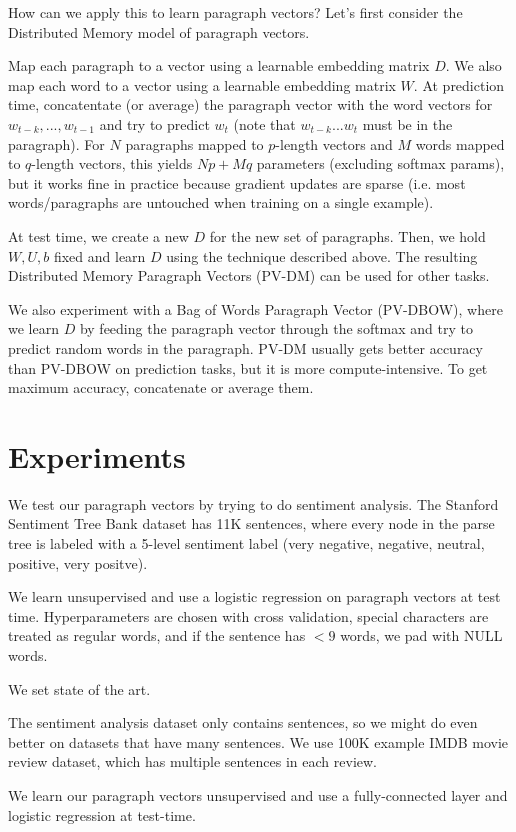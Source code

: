 \documentclass[a4paper]{article}
\begin{document}
How can we apply this to learn paragraph vectors? Let's first consider the
Distributed Memory model of paragraph vectors.

Map each paragraph to a vector using a learnable embedding matrix $D$. We also
map each word to a vector using a learnable embedding matrix $W$. At
prediction time, concatentate (or average) the paragraph vector with the word
vectors for $w_{t-k}, ..., w_{t-1}$ and try to predict $w_t$ (note that
$w_{t-k} ... w_t$ must be in the paragraph). For $N$ paragraphs mapped to
$p$-length vectors and $M$ words mapped to $q$-length vectors, this yields
$Np + Mq$ parameters (excluding softmax params), but it works fine in practice
because gradient updates are sparse (i.e. most words/paragraphs are untouched
when training on a single example).

At test time, we create a new $D$ for the
new set of paragraphs. Then, we hold $W, U, b$ fixed and learn $D$ using the
technique described above. The resulting Distributed Memory Paragraph Vectors
(PV-DM) can be used for other tasks.

We also experiment with a Bag of Words Paragraph Vector (PV-DBOW), where we learn
$D$ by feeding the paragraph vector through the softmax and try to predict
random words in the paragraph. PV-DM usually gets better accuracy than PV-DBOW
on prediction tasks, but it is more compute-intensive. To get maximum accuracy,
concatenate or average them.

\section{Experiments}
We test our paragraph vectors by trying to do sentiment analysis. The Stanford
Sentiment Tree Bank dataset has 11K sentences, where every node in the parse
tree is labeled with a 5-level sentiment label (very negative, negative,
neutral, positive, very positve).

We learn unsupervised and use a logistic regression on paragraph vectors at test
time. Hyperparameters are chosen with cross validation, special characters are
treated as regular words, and if the sentence has $< 9$ words, we pad with
NULL words.

We set state of the art.

The sentiment analysis dataset only contains sentences, so we might do even
better on datasets that have many sentences. We use 100K example IMDB movie
review dataset, which has multiple sentences in each review.

We learn our paragraph vectors unsupervised and use a fully-connected layer and
logistic regression at test-time.
\end{document}
